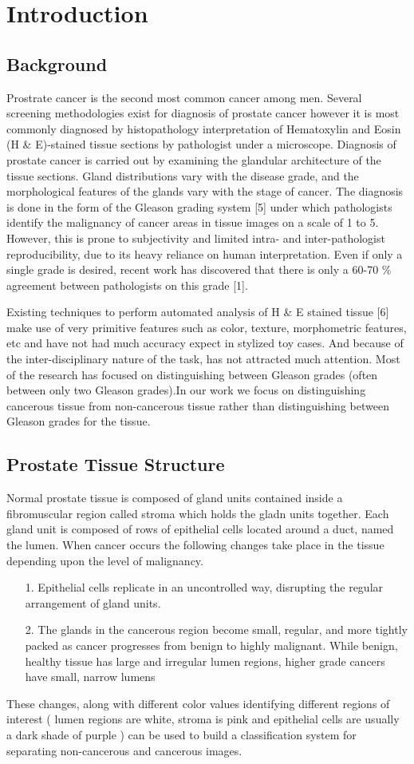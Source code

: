 \section{Introduction}
\label{sec:introduction}

\subsection{Background}
Prostrate cancer is the second most common cancer
among men. Several screening methodologies exist for diagnosis of prostate cancer however it is most commonly diagnosed by histopathology interpretation of Hematoxylin and Eosin (H \& E)-stained tissue sections by pathologist under a microscope. Diagnosis of prostate cancer is carried out by examining the glandular architecture of the tissue sections. Gland distributions vary with the disease grade, and the morphological features of the glands vary with the stage of cancer. The diagnosis is done in the form of the Gleason grading system [5] under which pathologists identify the malignancy of cancer areas in tissue images on a scale of 1 to 5. However, this is prone to subjectivity and limited intra- and inter-pathologist reproducibility, due to its heavy reliance on human interpretation. Even if only a single grade is desired, recent work has discovered that there is only a 60-70 \% agreement between pathologists on this grade [1].


Existing techniques to perform automated analysis of H \& E stained tissue [6] make use of very primitive features such as color, texture, morphometric features, etc and have not had much accuracy expect in stylized toy cases. And because of the inter-disciplinary nature of the task, has not attracted much attention. Most of the research has focused on distinguishing between Gleason grades (often between only two Gleason grades).In our work we focus on distinguishing cancerous tissue from non-cancerous tissue rather than distinguishing between Gleason grades for the tissue.

\subsection{Prostate Tissue Structure}
Normal prostate tissue is composed of gland units contained inside a fibromuscular region called stroma which holds the gladn units together. Each gland unit is composed of rows of epithelial cells located around a duct, named the lumen. When cancer occurs the following changes take place in the tissue depending upon the level of malignancy.
\begin{enumerate}
\item[1.] Epithelial cells replicate in an uncontrolled way, disrupting the regular arrangement of gland units.
\item[2.] The glands in the cancerous
region become small, regular, and more tightly packed as
cancer progresses from benign to highly malignant. While benign,
healthy tissue has large and irregular lumen regions, higher
grade cancers have small, narrow lumens
\end{enumerate}

These changes, along with different color values identifying different regions of interest ( lumen regions are white, stroma is pink and epithelial cells are usually a dark shade of purple ) can be used to build a classification system for separating non-cancerous and cancerous images.

